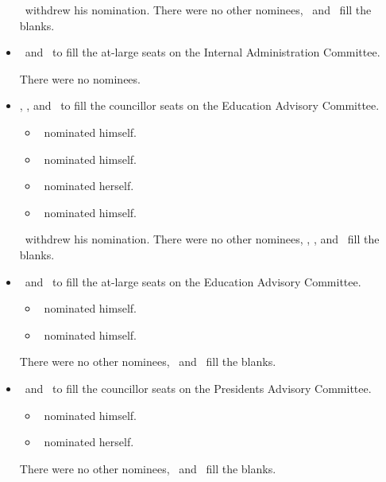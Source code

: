 \documentclass[12pt, letterpaper]{article}
\begin{document}
\begin{motion}
\begin{itemize}
            \tomson\ withdrew his nomination. There were no other nominees,
            \alexander\ and \subham\ fill the blanks. 

        \item \blank\ and \blank\ to fill the at-large seats on the Internal
            Administration Committee.

            There were no nominees. 

        \item \blank, \blank, and \blank\ to fill the councillor seats on the 
            Education Advisory Committee.
            \begin{itemize}
                \item \jason\ nominated himself.
                \item \ben\ nominated himself.
                \item \stephanie\ nominated herself.
                \item \alexander\ nominated himself. 
            \end{itemize}

            \alexander\ withdrew his nomination. There were no other nominees,
            \ben, \stephanie, and \jason\ fill the blanks. 

        \item \blank\ and \blank\ to fill the at-large seats on the 
            Education Advisory Committee.
            \begin{itemize}
                \item \tomson\ nominated himself.
                \item \william\ nominated himself.
            \end{itemize}

            There were no other nominees, \tomson\ and \william\ 
            fill the blanks. 

        \item \blank\ and \blank\ to fill the councillor seats on the 
            Presidents Advisory Committee.
            \begin{itemize}
                \item \seneca\ nominated himself.
                \item \rebecca\ nominated herself.
            \end{itemize}

            There were no other nominees, \seneca\ and \rebecca\ fill the 
            blanks. 


\end{itemize}
\end{motion}
\end{document}
